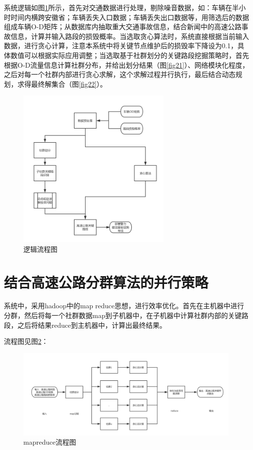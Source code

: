 		系统逻辑如图\ref{fig30}所示，首先对交通数据进行处理，剔除噪音数据，如：车辆在半小时时间内横跨安徽省；车辆丢失入口数据；车辆丢失出口数据等，用筛选后的数据组成车辆O-D矩阵；从数据库内抽取重大交通事故信息，结合新闻中的高速公路事故信息，计算并输入路段的损毁概率。当选取贪心算法时，系统直接根据当前输入数据，进行贪心计算，注意本系统中将关键节点维护后的损毁率下降设为0.1，具体数值可以根据实际应用调整；当选取基于社群划分的关键路段挖掘策略时，首先根据O-D流量信息计算社群分布，并给出划分结果（图\ref{fig21}）、网络模块化程度，之后对每一个社群内部进行贪心求解，这个求解过程并行执行，最后结合动态规划，求得最终解集合（图\ref{fig22}）。
		\begin{figure}[h]
		\centering
				\begin{minipage}{0.8\linewidth}
					\centering
					\includegraphics[width=3in]{picture/liuchengtu}
					\caption{逻辑流程图}
					\label{fig30}
				\end{minipage}%
		\end{figure}



	\section{结合高速公路分群算法的并行策略}
		系统中，采用hadoop中的map reduce思想，进行效率优化。首先在主机器中进行分群，然后将每一个社群数据map到子机器中，在子机器中计算社群内部的关键路段，之后将结果reduce到主机器中，计算出最终结果。

		流程图见图\ref{mapreduce}：
		\begin{figure}[h]
		\centering
				\begin{minipage}{0.8\linewidth}
					\centering
					\includegraphics[width=4.4in]{picture/mapreduce}
					\caption{mapreduce流程图}
					\label{mapreduce}
				\end{minipage}%
		\end{figure}


